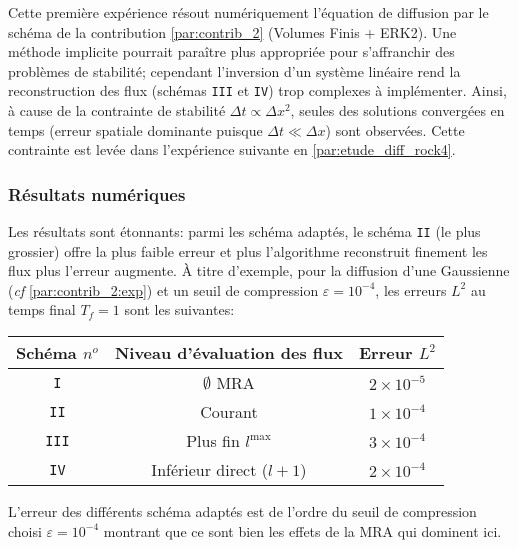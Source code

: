 Cette première expérience résout numériquement l'équation de diffusion par le schéma de la contribution \ref{par:contrib_2} (Volumes Finis + ERK2).
Une méthode implicite pourrait paraître plus appropriée pour s'affranchir des problèmes de stabilité; cependant l'inversion d'un système linéaire rend la reconstruction
des flux (schémas \texttt{III} et \texttt{IV}) trop complexes à implémenter.
Ainsi, à cause de la contrainte de stabilité $\Delta t \propto \Delta x^2$,
seules des solutions convergées en temps (erreur spatiale dominante puisque $\Delta t \ll \Delta x$) sont observées. Cette contrainte est levée dans l'expérience suivante en \ref{par:etude_diff_rock4}.\par 
\subsubsection{Résultats numériques}
Les résultats sont étonnants: parmi les schéma adaptés, le schéma \texttt{II} (le plus grossier) offre la plus faible erreur et plus l'algorithme reconstruit finement les flux plus l'erreur augmente. 
À titre d'exemple, pour la diffusion d'une Gaussienne (\textit{cf} \ref{par:contrib_2:exp}) et un seuil de compression $\varepsilon = 10^{-4}$, les erreurs $L^2$ au temps final $T_f=1$ sont les suivantes:\par
\begin{center}\begin{tabular}{|c|c|c|}
\hline
Schéma $n^o$ & Niveau d'évaluation des flux & Erreur $L^2$ \\
\hline
\texttt{I} & $\emptyset$ MRA & $2 \times 10^{-5}$ \\
\texttt{II} & Courant & $1 \times 10^{-4}$ \\
\texttt{III} & Plus fin $l^{\max}$& $3 \times 10^{-4}$ \\
\texttt{IV} & Inférieur direct ($l+1$) & $2 \times 10^{-4}$ \\


\hline
\end{tabular}\end{center}
L'erreur des différents schéma adaptés est de l'ordre du seuil de compression choisi $\varepsilon = 10^{-4}$ montrant que ce sont bien
les effets de la MRA qui dominent ici.

